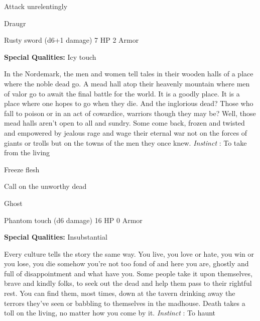\startitemize[1,packed]

\item Attack unrelentingly


\stopitemize
 
\startMonsterName
Draugr	 
\stopMonsterName
 

Rusty sword (d6+1 damage)	7 HP	2 Armor

 


 
\startMonsterQualities
{\bf Special Qualities:}  Icy touch
\stopMonsterQualities
 
\startMonsterDescription
In the Nordemark, the men and women tell tales in their wooden halls of a place where the noble dead go.  A mead hall atop their heavenly mountain where men of valor go to await the final battle for the world.  It is a goodly place.  It is a place where one hopes to go when they die.  And the inglorious dead?  Those who fall to poison or in an act of cowardice, warriors though they may be?  Well, those mead halls aren’t open to all and sundry. Some come back, frozen and twisted and empowered by jealous rage and wage their eternal war not on the forces of giants or trolls but on the towns of the men they once knew. {\em Instinct} : To take from the living
\stopMonsterDescription
 
\startitemize[1,packed]

\item Freeze flesh

 
\item Call on the unworthy dead


\stopitemize
 
\startMonsterName
Ghost	 
\stopMonsterName
 

Phantom touch (d6 damage)	16 HP	0 Armor

 


 
\startMonsterQualities
{\bf Special Qualities:}  Insubstantial
\stopMonsterQualities
 
\startMonsterDescription
Every culture tells the story the same way.  You live, you love or hate, you win or you lose, you die somehow you’re not too fond of and here you are, ghostly and full of disappointment and what have you.  Some people take it upon themselves, brave and kindly folks, to seek out the dead and help them pass to their rightful rest.  You can find them, most times, down at the tavern drinking away the terrors they’ve seen or babbling to themselves in the madhouse.  Death takes a toll on the living, no matter how you come by it. {\em Instinct} : To haunt
\stopMonsterDescription
 

